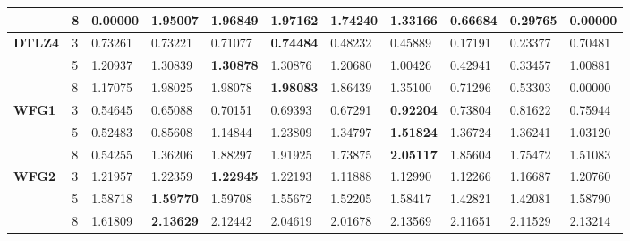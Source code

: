 \documentclass[conference]{IEEEtran}
\begin{document}
\begin{table*}[!htb]
\begin{tabular}{|l|l|l|l|l|l|l|l|l|l|l|}
	\textbf{}        & 8          & 0.00000          & 1.95007           & 1.96849               & \textbf{1.97162} & 1.74240             & 1.33166             & 0.66684            & 0.29765              & 0.00000          \\ \hline
	\textbf{DTLZ4}   & 3          & 0.73261          & 0.73221           & 0.71077               & \textbf{0.74484} & 0.48232             & 0.45889             & 0.17191            & 0.23377              & 0.70481          \\ \cline{2-11} 
	\textbf{}        & 5          & 1.20937          & 1.30839           & \textbf{1.30878}      & 1.30876          & 1.20680             & 1.00426             & 0.42941            & 0.33457              & 1.00881          \\ \cline{2-11} 
	\textbf{}        & 8          & 1.17075          & 1.98025           & 1.98078               & \textbf{1.98083} & 1.86439             & 1.35100             & 0.71296            & 0.53303              & 0.00000          \\ \hline
	\textbf{WFG1}    & 3          & 0.54645          & 0.65088           & 0.70151               & 0.69393          & 0.67291             & \textbf{0.92204}    & 0.73804            & 0.81622              & 0.75944          \\ \cline{2-11} 
	\textbf{}        & 5          & 0.52483          & 0.85608           & 1.14844               & 1.23809          & 1.34797             & \textbf{1.51824}    & 1.36724            & 1.36241              & 1.03120          \\ \cline{2-11} 
	\textbf{}        & 8          & 0.54255          & 1.36206           & 1.88297               & 1.91925          & 1.73875             & \textbf{2.05117}    & 1.85604            & 1.75472              & 1.51083          \\ \hline
	\textbf{WFG2}    & 3          & 1.21957          & 1.22359           & \textbf{1.22945}      & 1.22193          & 1.11888             & 1.12990             & 1.12266            & 1.16687              & 1.20760          \\ \cline{2-11} 
	\textbf{}        & 5          & 1.58718          & \textbf{1.59770}  & 1.59708               & 1.55672          & 1.52205             & 1.58417             & 1.42821            & 1.42081              & 1.58790          \\ \cline{2-11} 
	\textbf{}        & 8          & 1.61809          & \textbf{2.13629}  & 2.12442               & 2.04619          & 2.01678             & 2.13569             & 2.11651            & 2.11529              & 2.13214          \\ \hline

\end{tabular}
\end{table*}
\end{document}
